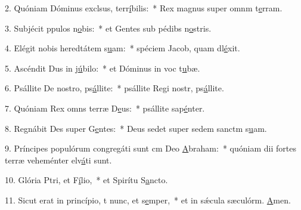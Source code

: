 2. Quóniam Dóminus exclsus, terr\uline{í}bilis:~* Rex magnus super omnm t\uline{e}rram.\par 
3. Subjécit ppulos n\uline{o}bis:~* et Gentes sub pédibs n\uline{o}stris.\par 
4. Elégit nobis heredtátem s\uline{u}am:~* spéciem Jacob, quam dl\uline{é}xit.\par 
5. Ascéndit Dus in j\uline{ú}bilo:~* et Dóminus in voc t\uline{u}bæ.\par 
6. Psállite De nostro, ps\uline{á}llite:~* psállite Regi nostr, ps\uline{á}llite.\par 
7. Quóniam Rex omns terræ D\uline{e}us:~* psállite sap\uline{é}nter.\par 
8. Regnábit Des super G\uline{e}ntes:~* Deus sedet super sedem sanctm s\uline{u}am.\par 
9. Príncipes populórum congregáti sunt cm Deo \uline{A}braham:~* quóniam dii fortes terræ veheménter elv\uline{á}ti sunt.\par 
10. Glória Ptri, et F\uline{í}lio,~* et Spirítu S\uline{a}ncto.\par 
11. Sicut erat in princípio, t nunc, et s\uline{e}mper,~* et in sǽcula sæculórm. \uline{A}men.\par 
